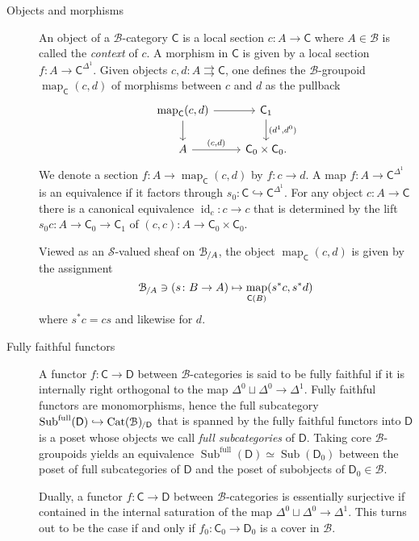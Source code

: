 \documentclass[reqno]{amsart}
\numberwithin{equation}{subsection}
\theoremstyle{plain}
\theoremstyle{definition}
\let\scr=\mathcal
\let\into=\hookrightarrow
\def\BB{\scr B}
\def\SS{\scr S}
\DeclareMathOperator{\id}{id}
\DeclareMathOperator{\Cat}{Cat}
\DeclareMathOperator{\Sub}{Sub}
\DeclareMathOperator{\Map}{map}
\newcommand{\map}[1]{\Map_{#1}}
\newcommand{\Over}[2]{#1_{\hspace{-1pt}/#2}}
\newcommand{\I}[1]{\mathsf{#1}}
\begin{document}
\begin{description}
    \item[Objects and morphisms] An object of a $\BB$-category $\I{C}$ is a local section $c\colon A\to\I{C}$ where $A\in\BB$ is called the \emph{context} of $c$. A morphism in $\I{C}$ is given by a local section $f\colon A\to \I{C}^{\Delta^1}$. Given objects $c,d\colon A\rightrightarrows \I{C}$, one defines the $\BB$-groupoid $\map{\I{C}}(c,d)$ of morphisms between $c$ and $d$ as the pullback
    \begin{equation*}
        \begin{tikzcd}
            \map{\I{C}}(c,d)\arrow[r]\arrow[d] & \I{C}_1\arrow[d, "{(d^1,d^0)}"]\\
            A\arrow[r, "{(c,d)}"]& \I{C}_0\times\I{C}_0.
        \end{tikzcd}
    \end{equation*}
    We denote a section $f\colon A\to \map{\I{C}}(c,d)$ by $f\colon c\to d$. A map $f\colon A\to \I{C}^{\Delta^1}$ is an equivalence if it factors through $s_0\colon \I{C}\into\I{C}^{\Delta^1}$. For any object $c\colon A\to \I{C}$ there is a canonical equivalence $\id_c\colon c\to c$ that is determined by the lift $s_0 c\colon A\to \I{C}_0\to\I{C}_1$ of $(c,c)\colon A\to \I{C}_0\times\I{C}_0$.
    
    Viewed as an $\SS$-valued sheaf on $\Over{\BB}{A}$, the object $\map{\I{C}}(c,d)$ is given by the assignment
    \begin{equation*}
        \Over{\BB}{A}\ni(s\colon B\to A)\mapsto \map{\I{C}(B)}(s^\ast c,s^\ast d)
    \end{equation*}
    where $s^\ast c= c s$ and likewise for $d$.
    
    \item[Fully faithful functors] A functor $f\colon \I{C}\to\I{D}$ between $\BB$-categories is said to be fully faithful if it is internally right orthogonal to the map $\Delta^0\sqcup\Delta^0\to \Delta^1$. Fully faithful functors are monomorphisms, hence the full subcategory $\Sub^{\mathrm{full}}(\I{D})\into\Over{\Cat(\BB)}{\I{D}}$ that is spanned by the fully faithful functors into $\I{D}$ is a poset whose objects we call \emph{full subcategories} of $\I{D}$. Taking core $\BB$-groupoids yields an equivalence $\Sub^{\mathrm{full}}(\I{D})\simeq \Sub(\I{D}_0)$ between the poset of full subcategories of $\I{D}$ and the poset of subobjects of $\I{D}_0\in\BB$.
    
    Dually, a functor $f\colon \I{C}\to\I{D}$ between $\BB$-categories is essentially surjective if contained in the internal saturation of the map $\Delta^0\sqcup\Delta^0\to \Delta^1$. This turns out to be the case if and only if $f_0\colon \I{C}_0\to\I{D}_0$ is a cover in $\BB$.
    

\end{description}
\end{document}
